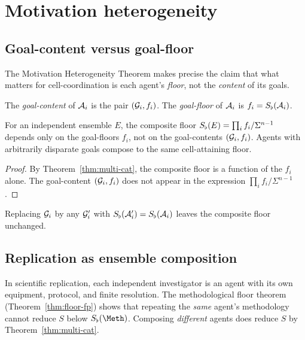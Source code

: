 \section{Motivation heterogeneity}
\label{sec:ch03-motivation}

\subsection{Goal-content versus goal-floor}

The Motivation Heterogeneity Theorem makes precise the claim that what
matters for cell-coordination is each agent's \emph{floor}, not the
\emph{content} of its goals.

\begin{definition}\label{def:goal-content}
The \emph{goal-content} of $\mathcal{A}_i$ is the pair $(\mathcal{G}_i,f_i)$.
The \emph{goal-floor} of $\mathcal{A}_i$ is $f_i=S_{\flat}(\mathcal{A}_i)$.
\end{definition}

\begin{theorem}\label{thm:mot-het}
For an independent ensemble $E$, the composite floor
$S_{\flat}(E)=\prod_i f_i/\Sigma^{n-1}$ depends only on the goal-floors
$f_i$, not on the goal-contents $(\mathcal{G}_i,f_i)$. Agents with
arbitrarily disparate goals compose to the same cell-attaining floor.
\end{theorem}

\begin{proof}
By Theorem~\ref{thm:multi-cat}, the composite floor is a function of the
$f_i$ alone. The goal-content $(\mathcal{G}_i,f_i)$ does not appear in
the expression $\prod_i f_i/\Sigma^{n-1}$.
\end{proof}

\begin{corollary}\label{cor:goal-sub}
Replacing $\mathcal{G}_i$ by any $\mathcal{G}_i'$ with $S_{\flat}(\mathcal{A}_i')=S_{\flat}(\mathcal{A}_i)$
leaves the composite floor unchanged.
\end{corollary}

\subsection{Replication as ensemble composition}

In scientific replication, each independent investigator is an agent with
its own equipment, protocol, and finite resolution. The methodological floor
theorem (Theorem~\ref{thm:floor-fp}) shows that repeating the \emph{same}
agent's methodology cannot reduce $S$ below $\Sfloor(\Meth)$. Composing
\emph{different} agents does reduce $S$ by Theorem~\ref{thm:multi-cat}.

